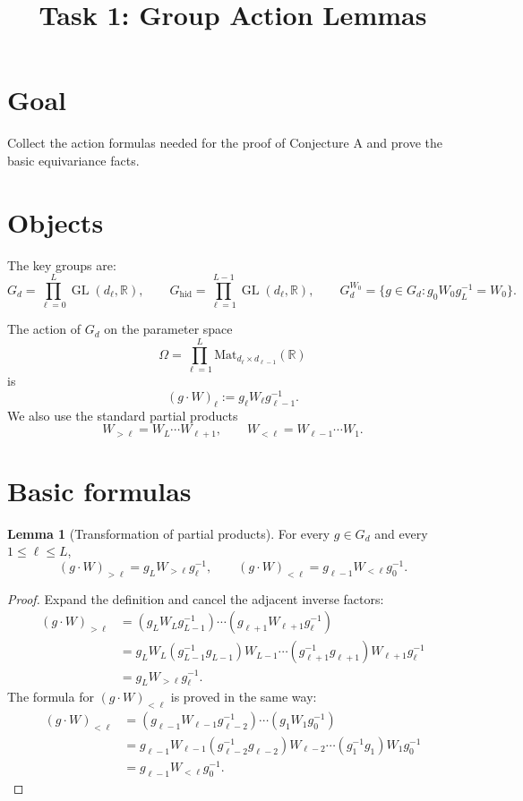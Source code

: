\documentclass{article}
\title{Task 1: Group Action Lemmas}
\date{}
\newcommand{\GL}{\operatorname{GL}}
\newcommand{\R}{\mathbb{R}}
\newcommand{\Mat}{\mathrm{Mat}}
\theoremstyle{definition}
\newtheorem{lemma}[theorem]{Lemma}
\begin{document}
\maketitle

\section{Goal}

Collect the action formulas needed for the proof of Conjecture A and prove the basic equivariance facts.

\section{Objects}

The key groups are:
\[
G_d=\prod_{\ell=0}^L \GL(d_\ell,\R),
\qquad
G_{\mathrm{hid}}=\prod_{\ell=1}^{L-1}\GL(d_\ell,\R),
\qquad
G_d^{W_0}=\{g\in G_d : g_0W_0g_L^{-1}=W_0\}.
\]

The action of $G_d$ on the parameter space
\[
\Omega=\prod_{\ell=1}^L \Mat_{d_\ell\times d_{\ell-1}}(\R)
\]
is
\[
(g\cdot W)_\ell:=g_\ell W_\ell g_{\ell-1}^{-1}.
\]
We also use the standard partial products
\[
W_{>\ell}=W_L\cdots W_{\ell+1},
\qquad
W_{<\ell}=W_{\ell-1}\cdots W_1.
\]

\section{Basic formulas}

\begin{lemma}[Transformation of partial products]\label{lem:partial-product-transform}
For every $g\in G_d$ and every $1\le \ell\le L$,
\[
(g\cdot W)_{>\ell}=g_LW_{>\ell}g_\ell^{-1},
\qquad
(g\cdot W)_{<\ell}=g_{\ell-1}W_{<\ell}g_0^{-1}.
\]
\end{lemma}

\begin{proof}
Expand the definition and cancel the adjacent inverse factors:
\begin{align*}
(g\cdot W)_{>\ell}
&=
(g_LW_Lg_{L-1}^{-1})\cdots(g_{\ell+1}W_{\ell+1}g_\ell^{-1}) \\
&=
g_LW_L(g_{L-1}^{-1}g_{L-1})W_{L-1}\cdots(g_{\ell+1}^{-1}g_{\ell+1})W_{\ell+1}g_\ell^{-1} \\
&=
g_LW_{>\ell}g_\ell^{-1}.
\end{align*}
The formula for $(g\cdot W)_{<\ell}$ is proved in the same way:
\begin{align*}
(g\cdot W)_{<\ell}
&=
(g_{\ell-1}W_{\ell-1}g_{\ell-2}^{-1})\cdots(g_1W_1g_0^{-1}) \\
&=
g_{\ell-1}W_{\ell-1}(g_{\ell-2}^{-1}g_{\ell-2})W_{\ell-2}\cdots(g_1^{-1}g_1)W_1g_0^{-1} \\
&=
g_{\ell-1}W_{<\ell}g_0^{-1}.
\end{align*}
\end{proof}
\end{document}
